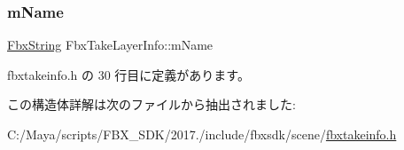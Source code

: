 \subsubsection{\texorpdfstring{m\+Name}{mName}}
{\footnotesize\ttfamily \hyperlink{class_fbx_string}{Fbx\+String} Fbx\+Take\+Layer\+Info\+::m\+Name}



 fbxtakeinfo.\+h の 30 行目に定義があります。



この構造体詳解は次のファイルから抽出されました\+:\begin{DoxyCompactItemize}
\item 
C\+:/\+Maya/scripts/\+F\+B\+X\+\_\+\+S\+D\+K/2017./include/fbxsdk/scene/\hyperlink{fbxtakeinfo_8h}{fbxtakeinfo.\+h}\end{DoxyCompactItemize}
